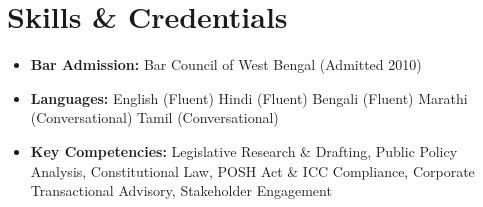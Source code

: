 \section{Skills \& Credentials}

\begin{itemize}[leftmargin=*, noitemsep]
    \item \textbf{Bar Admission:} Bar Council of West Bengal (Admitted 2010)
    \item \textbf{Languages:} English (Fluent) \textbar{} Hindi (Fluent) \textbar{} Bengali (Fluent) \textbar{} Marathi (Conversational) \textbar{} Tamil (Conversational)
    \item \textbf{Key Competencies:} Legislative Research \& Drafting, Public Policy Analysis, Constitutional Law, POSH Act \& ICC Compliance, Corporate Transactional Advisory, Stakeholder Engagement
\end{itemize}
